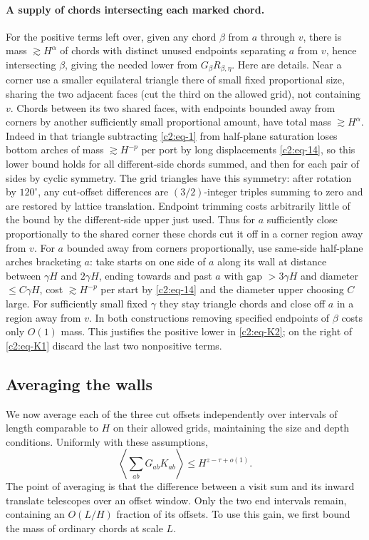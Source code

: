 \paragraph{A supply of chords intersecting each marked chord.}
For the positive terms left over, given any chord \(\beta\) from \(a\) through \(v\), there is mass \(\gtrsim H^\alpha\) of chords with distinct unused endpoints separating \(a\) from \(v\), hence intersecting \(\beta\), giving the needed lower from \(G_\beta R_{\beta,\eta}\). Here are details. Near a corner use a smaller equilateral triangle there of small fixed proportional size, sharing the two adjacent faces (cut the third on the allowed grid), not containing \(v\). Chords between its two shared faces, with endpoints bounded away from corners by another sufficiently small proportional amount, have total mass \(\gtrsim H^\alpha\). Indeed in that triangle subtracting \eqref{c2:eq-1} from half-plane saturation loses bottom arches of mass \(\gtrsim H^{-p}\) per port by long displacements \eqref{c2:eq-14}, so this lower bound holds for all different-side chords summed, and then for each pair of sides by cyclic symmetry. The grid triangles have this symmetry: after rotation by \(120^\circ\), any cut-offset differences are \((3/2)\)-integer triples summing to zero and are restored by lattice translation. Endpoint trimming costs arbitrarily little of the bound by the different-side upper just used. Thus for \(a\) sufficiently close proportionally to the shared corner these chords cut it off in a corner region away from \(v\). For \(a\) bounded away from corners proportionally, use same-side half-plane arches bracketing \(a\): take starts on one side of \(a\) along its wall at distance between \(\gamma H\) and \(2\gamma H\), ending towards and past \(a\) with gap \(>3\gamma H\) and diameter \(\le C\gamma H\), cost \(\gtrsim H^{-p}\) per start by \eqref{c2:eq-14} and the diameter upper choosing \(C\) large. For sufficiently small fixed \(\gamma\) they stay triangle chords and close off \(a\) in a region away from \(v\). In both constructions removing specified endpoints of \(\beta\) costs only \(O(1)\) mass. This justifies the positive lower in \eqref{c2:eq-K2}; on the right of \eqref{c2:eq-K1} discard the last two nonpositive terms.

\subsection{Averaging the walls}
We now average each of the three cut offsets independently over intervals of length comparable to \(H\) on their allowed grids, maintaining the size and depth conditions. Uniformly with these assumptions,
\begin{equation}
 \left\langle\sum_{ab}G_{ab}K_{ab}\right\rangle
 \le H^{z-\tau+o(1)}.                                                     \label{c2:eq-K3}
\end{equation}
The point of averaging is that the difference between a visit sum and
its inward translate telescopes over an offset window. Only the two end
intervals remain, containing an \(O(L/H)\) fraction of its offsets. To use
this gain, we first bound the mass of ordinary chords at scale \(L\).


